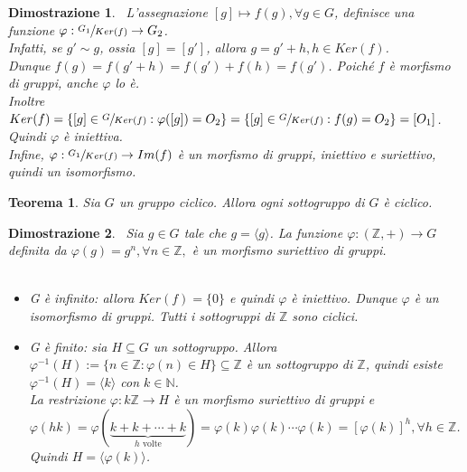 \documentclass[a4paper,12pt]{article}
\theoremstyle{def}
\theoremstyle{prop}
\theoremstyle{esempio}
\theoremstyle{dimostrazione}
\newtheorem*{dimostrazione}{Dimostrazione}
\theoremstyle{teo}
\newtheorem*{teorema}{Teorema}
\theoremstyle{osservazione}
\begin{document}
\begin{dimostrazione}
	\
	L'assegnazione \([g] \mapsto f(g), \forall g \in  G\), definisce una funzione \(\varphi : \sfrac{G_1}{Ker(f)}
	\rightarrow G_2\).\\
	Infatti, se \(g' \sim g\), ossia \([g]  = [g']\), allora \(g = g' + h , h \in Ker(f)\).\\
	Dunque \(f(g) = f(g' + h) = f(g') + f(h) = f(g')\). Poiché \(f\) è morfismo di gruppi, anche \(\varphi\) lo è.\\
	Inoltre \(Ker(f) = \{[g] \in \sfrac{G}{Ker(f)} : \varphi([g]) = O_2\}=\{[g] \in  \sfrac{G}{Ker(f)} : f(g) = O_2\}
	= {[O_1]}\). Quindi \(\varphi\) è iniettiva.\\
	Infine, \( \varphi : \sfrac{G_1}{Ker(f)} \rightarrow Im(f)\) è un morfismo di gruppi, iniettivo e suriettivo, quindi un isomorfismo.
\end{dimostrazione}


\begin{teorema}
	Sia \(G\) un gruppo ciclico. Allora ogni sottogruppo di \(G\) è ciclico.
\end{teorema}

\begin{dimostrazione}
	\
	Sia \(g \in G\) tale che \(g = \langle g \rangle\). La funzione \(\varphi: (\mathbb{Z} , +) \rightarrow G\) definita
	da \(\varphi(g) = g^n, \forall  n \in \mathbb{Z}, \) è un morfismo suriettivo di gruppi.\\
	\
	\begin{itemize}
		\item G è infinito: allora \(Ker(f) = \{0\}\) e quindi \(\varphi\) è iniettivo. Dunque \(\varphi\) è un
		      isomorfismo di gruppi. Tutti i sottogruppi di \(\mathbb{Z} \) sono ciclici.
		\item G è finito: sia \(H \subseteq G\) un sottogruppo. Allora \(\varphi^{-1}(H) := \{n \in \mathbb{Z} :
		      \varphi(n) \in H\} \subseteq \mathbb{Z} \) è un sottogruppo di \(\mathbb{Z} \), quindi esiste \(
		      \varphi^{-1}(H)= \langle k \rangle\) con \(k \in \mathbb{N} \).\\
		      La restrizione \(\varphi: k \mathbb{Z} \rightarrow H\) è un morfismo suriettivo di gruppi e
		      \(\varphi(hk) = \varphi(\underbrace{k+k+\cdots+k}_{h \text{ volte}}) = \varphi(k) \varphi(k) \cdots
		      \varphi(k) = [\varphi(k)]^h , \forall h \in \mathbb{Z} \). Quindi \(H = \langle \varphi(k) \rangle\).
	\end{itemize}
\end{dimostrazione}
\end{document}
